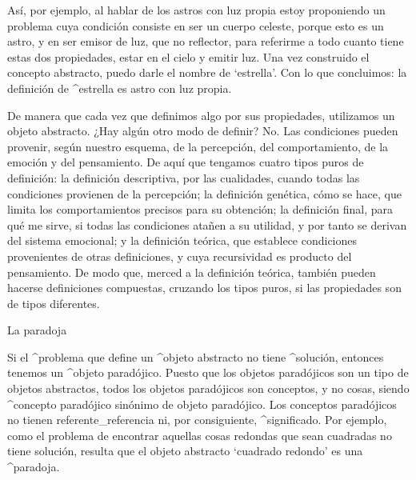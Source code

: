Así, por ejemplo, al hablar de los astros con luz propia estoy
proponiendo un problema cuya condición consiste en ser un cuerpo
celeste, porque esto es un astro, y en ser emisor de luz, que no
reflector, para referirme a todo cuanto tiene estas dos propiedades,
estar en el cielo y emitir luz. Una vez construido el concepto
abstracto, puedo darle el nombre de `estrella'. Con lo que concluimos:
la definición de ^{estrella} es astro con luz propia.

De manera que cada vez que definimos algo por sus propiedades,
utilizamos un objeto abstracto. ¿Hay algún otro modo de definir? No. Las
condiciones pueden provenir, según nuestro esquema, de la percepción,
del comportamiento, de la emoción y del pensamiento. De aquí que
tengamos cuatro tipos puros de definición: la definición descriptiva,
por las cualidades, cuando todas las condiciones provienen de la
percepción; la definición genética, cómo se hace, que limita los
comportamientos precisos para su obtención; la definición final, para
qué me sirve, si todas las condiciones atañen a su utilidad, y por tanto
se derivan del sistema emocional; y la definición teórica, que establece
condiciones provenientes de otras definiciones, y cuya recursividad es
producto del pensamiento. De modo que, merced a la definición teórica,
también pueden hacerse definiciones compuestas, cruzando los tipos
puros, si las propiedades son de tipos diferentes.


\Section La paradoja

Si el ^{problema} que define un ^{objeto abstracto} no tiene
^{solución}, entonces tenemos un ^{objeto paradójico}. Puesto que los
objetos paradójicos son un tipo de objetos abstractos, todos los objetos
paradójicos son conceptos, y no cosas, siendo ^{concepto paradójico}
sinónimo de objeto paradójico. Los conceptos paradójicos no tienen
referente_{referencia} ni, por consiguiente, ^{significado}. Por
ejemplo, como el problema de encontrar aquellas cosas redondas que sean
cuadradas no tiene solución, resulta que el objeto abstracto `cuadrado
redondo' es una ^{paradoja}.

